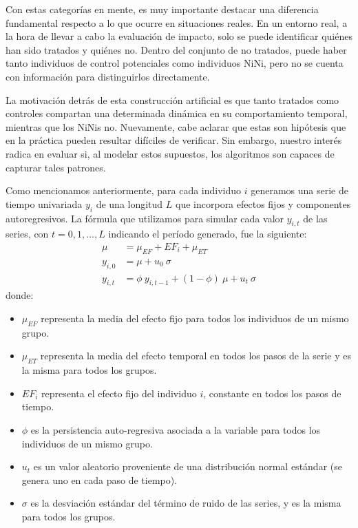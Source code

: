 \documentclass[../../main.tex]{subfiles}
\begin{document}
Con estas categorías en mente, es muy importante destacar una diferencia fundamental
respecto a lo que ocurre en situaciones reales. En un entorno real, a la hora de llevar a
cabo la evaluación de impacto, solo se puede identificar quiénes han sido tratados y
quiénes no. Dentro del conjunto de no tratados, puede haber tanto individuos de control
potenciales como individuos NiNi, pero no se cuenta con información para distinguirlos
directamente.

La motivación detrás de esta construcción artificial es que tanto tratados como controles
compartan una determinada dinámica en su comportamiento temporal, mientras que los NiNis
no. Nuevamente, cabe aclarar que estas son hipótesis que en la práctica pueden resultar
difíciles de verificar. Sin embargo, nuestro interés radica en evaluar si, al modelar
estos supuestos, los algoritmos son capaces de capturar tales patrones.

Como mencionamos anteriormente, para cada individuo \(i\) generamos una serie de tiempo
univariada \(y_i\) de una longitud \(L\) que incorpora efectos fijos y componentes
autoregresivos. La fórmula que utilizamos para simular cada valor \(y_{i,t}\) de las
series, con \(t = 0, 1, ..., L\) indicando el período generado, fue la siguiente:
\begin{align}
    \mu &= \mu_{EF} + EF_i + \mu_{ET} \\
    y_{i,0} &= \mu + u_0  \ \sigma \\
    y_{i,t} &= \phi \ y_{i,t-1} + (1 - \phi) \ \mu +  u_t \ \sigma
\end{align}
donde:
\begin{itemize}[itemsep=0.1cm]
    \item \(\mu_{EF}\) representa la media del efecto fijo para todos los individuos
    de un mismo grupo.
    \item \(\mu_{ET}\) representa la media del efecto temporal en todos los pasos
    de la serie y es la misma para todos los grupos.
    \item \(EF_i\) representa el efecto fijo del individuo \(i\), constante en todos
    los pasos de tiempo.
    \item \(\phi\) es la persistencia auto-regresiva asociada a la variable para
    todos los individuos de un mismo grupo.
    \item \(u_t\) es un valor aleatorio proveniente de una distribución normal estándar
    (se genera uno en cada paso de tiempo).
    \item \(\sigma\) es la desviación estándar del término de ruido de las series,
    y es la misma para todos los grupos.
\end{itemize}
\end{document}
